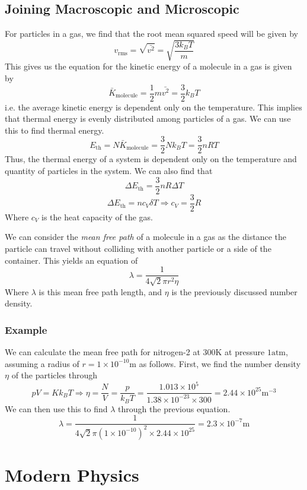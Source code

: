 \documentclass[12pt]{report}
\begin{document}
\begin{flushleft}
\subsection*{Joining Macroscopic and Microscopic}

For particles in a gas, we find that the root mean squared speed will be given
by
\[v_\mathrm{rms} = \sqrt{\bar{v^2}} = \sqrt{\frac{3k_BT}{m}}\]
This gives us the equation for the kinetic energy of a molecule in a gas is
given by
\[\bar{K}_\mathrm{molecule} = \frac{1}{2}m\bar{v^2} = \frac{3}{2}k_BT\]
i.e. the average kinetic energy is dependent only on the temperature. This
implies that thermal energy is evenly distributed among particles of a gas. We
can use this to find thermal energy.
\[E_\mathrm{th} = N\bar{K}_\mathrm{molecule} = \frac{3}{2}Nk_BT 
= \frac{3}{2}nRT\]
Thus, the thermal energy of a system is dependent only on the temperature and
quantity of particles in the system. We can also find that
\[\Delta E_\mathrm{th} = \frac{3}{2}nR\Delta T\]
\[\Delta E_\mathrm{th} = nc_V\delta T \Rightarrow c_V = \frac{3}{2}R\]
Where \(c_V\) is the heat capacity of the gas. \par
We can consider the \textit{mean free path} of a molecule in a gas as the
distance the particle can travel without colliding with another particle or a
side of the container. This yields an equation of
\[\lambda = \frac{1}{4\sqrt{2}\pi r^2\eta}\]
Where \(\lambda\) is this mean free path length, and \(\eta\) is the previously
discussed number density.

\subsubsection*{Example}
We can calculate the mean free path for nitrogen-2 at \(300\mathrm{K}\) at
pressure \(1\mathrm{atm}\), assuming a radius of
\(r = 1\times10^{-10}\mathrm{m}\) as follows. First, we find the number density
\(\eta\) of the particles through
\[pV = Kk_BT \Rightarrow \eta = \frac{N}{V} = \frac{p}{k_BT}
= \frac{1.013\times10^5}{1.38\times10^{-23}\times300}
= 2.44\times10^{25}\mathrm{m}^{-3}\]
We can then use this to find \(\lambda\) through the previous equation.
\[\lambda = \frac{1}{4\sqrt{2}\pi(1\times10^{-10})^2\times2.44\times10^{25}}
= 2.3\times10^{-7}\mathrm{m}\]

\section*{Modern Physics}


\end{flushleft}
\end{document}
